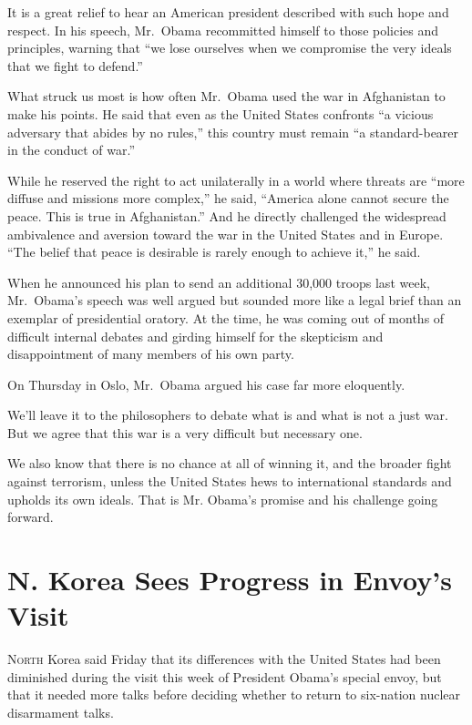 ﻿\documentclass[12pt]{article}
\begin{document}
It is a great relief to hear an American president described with such hope and respect. In his
speech, Mr.~Obama recommitted himself to those policies and principles, warning that ``we lose
ourselves when we compromise the very ideals that we fight to defend.''

What struck us most is how often Mr.~Obama used the war in Afghanistan to make his points. He said
that even as the United States confronts ``a vicious adversary that abides by no rules,'' this
country must remain ``a standard-bearer in the conduct of war.''

While he reserved the right to act unilaterally in a world where threats are ``more diffuse and
missions more complex,'' he said, ``America alone cannot secure the peace. This is true in
Afghanistan.'' And he directly challenged the widespread ambivalence and aversion toward the war in
the United States and in Europe. ``The belief that peace is desirable is rarely enough to achieve
it,'' he said.

When he announced his plan to send an additional 30,000 troops last week, Mr.~Obama's speech was
well argued but sounded more like a legal brief than an exemplar of presidential oratory. At the
time, he was coming out of months of difficult internal debates and girding himself for the
skepticism and disappointment of many members of his own party.

On Thursday in Oslo, Mr.~Obama argued his case far more eloquently.

We'll leave it to the philosophers to debate what is and what is not a just war. But we agree that
this war is a very difficult but necessary one.

We also know that there is no chance at all of winning it, and the broader fight against terrorism,
unless the United States hews to international standards and upholds its own ideals. That is Mr.
Obama's promise and his challenge going forward.

\section{N. Korea Sees Progress in Envoy's Visit}

\lettrine{N}{orth} Korea said Friday that its differences with the United
States had been diminished during the visit this week of President Obama's special envoy, but that
it needed more talks before deciding whether to return to six-nation nuclear disarmament talks.
\end{document}
